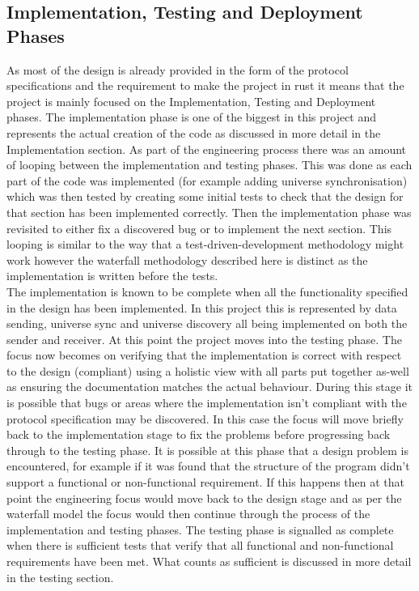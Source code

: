 \documentclass[11pt,a4paper]{article}
\begin{document}
\subsection{Implementation, Testing and Deployment Phases}
As most of the design is already provided in the form of the protocol specifications and the requirement to make the project in rust it means that the project is mainly focused on the Implementation, Testing and Deployment phases. The implementation phase is one of the biggest in this project and represents the actual creation of the code as discussed in more detail in the Implementation section. As part of the engineering process there was an amount of looping between the implementation and testing phases. This was done as each part of the code was implemented (for example adding universe synchronisation) which was then tested by creating some initial tests to check that the design for that section has been implemented correctly. Then the implementation phase was revisited to either fix a discovered bug or to implement the next section. This looping is similar to the way that a test-driven-development methodology might work however the waterfall methodology described here is distinct as the implementation is written before the tests.\\

The implementation is known to be complete when all the functionality specified in the design has been implemented. In this project this is represented by data sending, universe sync and universe discovery all being implemented on both the sender and receiver. At this point the project moves into the testing phase. The focus now becomes on verifying that the implementation is correct with respect to the design (compliant) using a holistic view with all parts put together as-well as ensuring the documentation matches the actual behaviour. During this stage it is possible that bugs or areas where the implementation isn't compliant with the protocol specification may be discovered. In this case the focus will move briefly back to the implementation stage to fix the problems before progressing back through to the testing phase. It is possible at this phase that a design problem is encountered, for example if it was found that the structure of the program didn't support a functional or non-functional requirement. If this happens then at that point the engineering focus would move back to the design stage and as per the waterfall model the focus would then continue through the process of the implementation and testing phases. The testing phase is signalled as complete when there is sufficient tests that verify that all functional and non-functional requirements have been met. What counts as sufficient is discussed in more detail in the testing section.\\
\end{document}
